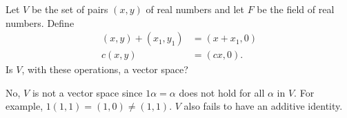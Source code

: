  Let $V$ be the set of pairs $(x,y)$ of real numbers and let
$F$ be the field of real numbers. Define
\begin{align*}
  (x,y) + (x_1,y_1) &= (x+x_1,0) \\
  c(x,y) &= (cx,0).
\end{align*}
Is $V$, with these operations, a vector space?
\begin{solution}
  No, $V$ is not a vector space since $1\alpha = \alpha$ does not hold
  for all $\alpha$ in $V$. For example, $1(1,1) = (1,0)\neq(1,1)$. $V$
  also fails to have an additive identity.
\end{solution}
